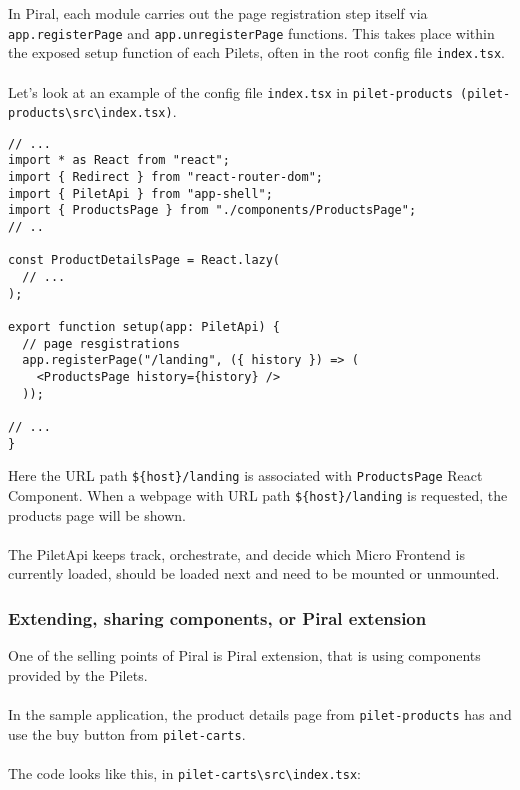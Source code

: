 \documentclass[a4paper]{book}
\begin{document}
In Piral, each module carries out the page registration step itself via \verb|app.registerPage| and \verb|app.unregisterPage| functions. This takes place within the exposed setup function of each Pilets, often in the root config file \verb|index.tsx|.
\\ \\
Let’s look at an example of the config file \verb|index.tsx| in \verb|pilet-products (pilet-products\src\index.tsx)|.

\begin{lstlisting}[caption={pilet-products index.tsx}]
// ...
import * as React from "react";
import { Redirect } from "react-router-dom";
import { PiletApi } from "app-shell";
import { ProductsPage } from "./components/ProductsPage";
// ..

const ProductDetailsPage = React.lazy(
  // ...
);

export function setup(app: PiletApi) {
  // page resgistrations
  app.registerPage("/landing", ({ history }) => (
    <ProductsPage history={history} />
  ));

// ...
}
\end{lstlisting}

Here the URL path \verb|${host}/landing| is associated with \verb|ProductsPage| React Component. When a webpage with URL path \verb|${host}/landing| is requested, the products page will be shown.
\\ \\
The PiletApi keeps track, orchestrate, and decide which Micro Frontend is currently loaded, should be loaded next and need to be mounted or unmounted.
\subsubsection{Extending, sharing components, or Piral extension}
One of the selling points of Piral is Piral extension, that is using components provided by the Pilets. 
\\ \\
In the sample application, the product details page from \verb|pilet-products| has and use the buy button from \verb|pilet-carts|. 
\\ \\The code looks like this, in \verb|pilet-carts\src\index.tsx|:
\end{document}
